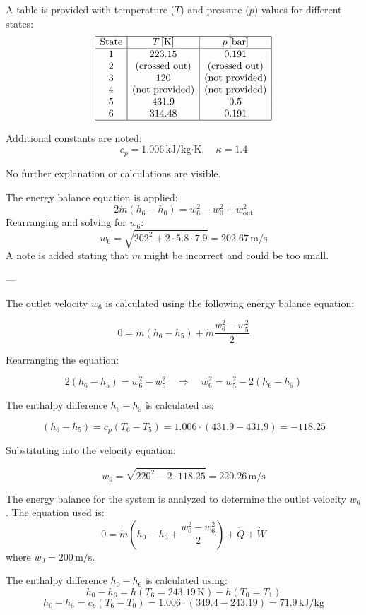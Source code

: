 A table is provided with temperature (\( T \)) and pressure (\( p \)) values for different states:  
\[
\begin{array}{|c|c|c|}
\hline
\text{State} & T \, [\text{K}] & p \, [\text{bar}] \\
\hline
1 & 223.15 & 0.191 \\
2 & \text{(crossed out)} & \text{(crossed out)} \\
3 & 120 & \text{(not provided)} \\
4 & \text{(not provided)} & \text{(not provided)} \\
5 & 431.9 & 0.5 \\
6 & 314.48 & 0.191 \\
\hline
\end{array}
\]

Additional constants are noted:  
\[
c_p = 1.006 \, \text{kJ}/\text{kg·K}, \quad \kappa = 1.4
\]  

No further explanation or calculations are visible.

The energy balance equation is applied:  
\[
2 \dot{m} (h_6 - h_0) = w_6^2 - w_0^2 + w_{\text{out}}^2
\]  
Rearranging and solving for \( w_6 \):  
\[
w_6 = \sqrt{202^2 + 2 \cdot 5.8 \cdot 7.9} = 202.67 \, \text{m/s}
\]  
A note is added stating that \( \dot{m} \) might be incorrect and could be too small.

---

The outlet velocity \( w_6 \) is calculated using the following energy balance equation:  

\[
0 = \dot{m} (h_6 - h_5) + \dot{m} \frac{w_6^2 - w_5^2}{2}
\]

Rearranging the equation:  

\[
2(h_6 - h_5) = w_6^2 - w_5^2 \quad \Rightarrow \quad w_6^2 = w_5^2 - 2(h_6 - h_5)
\]

The enthalpy difference \( h_6 - h_5 \) is calculated as:  

\[
(h_6 - h_5) = c_p (T_6 - T_5) = 1.006 \cdot (431.9 - 431.9) = -118.25
\]

Substituting into the velocity equation:  

\[
w_6 = \sqrt{220^2 - 2 \cdot 118.25} = 220.26 \, \text{m/s}
\]

The energy balance for the system is analyzed to determine the outlet velocity \( w_6 \). The equation used is:  
\[
0 = \dot{m} \left( h_0 - h_6 + \frac{w_0^2 - w_6^2}{2} \right) + \dot{Q} + \dot{W}
\]  
where \( w_0 = 200 \, \text{m/s} \).  

The enthalpy difference \( h_0 - h_6 \) is calculated using:  
\[
h_0 - h_6 = h(T_6 = 243.19 \, \text{K}) - h(T_0 = T_1)
\]  
\[
h_0 - h_6 = c_p (T_6 - T_0) = 1.006 \cdot (349.4 - 243.19) = 71.9 \, \text{kJ/kg}
\]